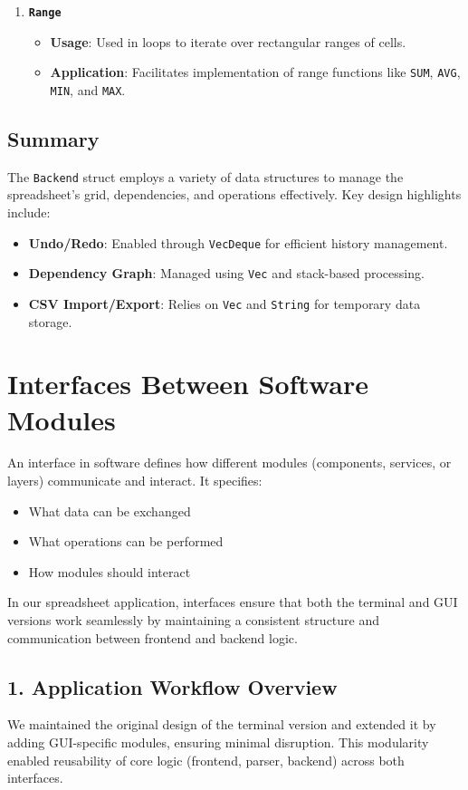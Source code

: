 \documentclass{article}
\begin{document}
\begin{enumerate}
    \item \textbf{\texttt{Range}}
    \begin{itemize}
        \item \textbf{Usage}: Used in loops to iterate over rectangular ranges of cells.
        \item \textbf{Application}: Facilitates implementation of range functions like \texttt{SUM}, \texttt{AVG}, \texttt{MIN}, and \texttt{MAX}.
    \end{itemize}
\end{enumerate}

\subsection*{Summary}
The \texttt{Backend} struct employs a variety of data structures to manage the spreadsheet's grid, dependencies, and operations effectively. Key design highlights include:
\begin{itemize}
    \item \textbf{Undo/Redo}: Enabled through \texttt{VecDeque} for efficient history management.
    \item \textbf{Dependency Graph}: Managed using \texttt{Vec} and stack-based processing.
    \item \textbf{CSV Import/Export}: Relies on \texttt{Vec} and \texttt{String} for temporary data storage.
   
\end{itemize}
\section*{Interfaces Between Software Modules}
An interface in software defines how different modules (components, services, or layers) communicate and interact. It specifies:
\begin{itemize}
    \item What data can be exchanged
    \item What operations can be performed
    \item How modules should interact
\end{itemize}

In our spreadsheet application, interfaces ensure that both the terminal and GUI versions work seamlessly by maintaining a consistent structure and communication between frontend and backend logic.

\subsection*{1. Application Workflow Overview}
We maintained the original design of the terminal version and extended it by adding GUI-specific modules, ensuring minimal disruption. This modularity enabled reusability of core logic (frontend, parser, backend) across both interfaces.
\end{document}
